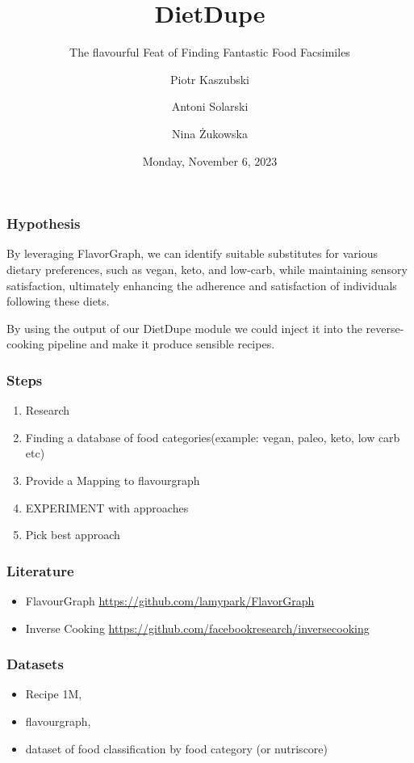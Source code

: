 \documentclass{beamer}
\title{DietDupe}
\subtitle{The flavourful Feat of Finding Fantastic Food Facsimiles}
\author{Piotr Kaszubski \and Antoni Solarski \and Nina Żukowska}
\institute{Poznań University of Technology}
\date{Monday, November  6, 2023}
\begin{document}
\maketitle
\begin{frame}
	\frametitle{Hypothesis}
	By leveraging FlavorGraph, we can identify suitable
	substitutes for various dietary preferences, such as vegan,
	keto, and low-carb, while maintaining sensory satisfaction,
	ultimately enhancing the adherence and satisfaction of
	individuals following these diets.

	\vspace{1cm}
	\noindent
	By using the output of our DietDupe module we could inject it
	into the reverse-cooking pipeline and make it produce
	sensible recipes.
\end{frame}

\begin{frame}
	\frametitle{Steps}
	\begin{enumerate}
		\item Research
		\item Finding a database of food categories(example: vegan, paleo, keto, low carb etc) 
		\item Provide a Mapping to flavourgraph 
		\item EXPERIMENT with approaches 
		\item Pick best approach
	\end{enumerate}
\end{frame}

\begin{frame}
	\frametitle{Literature}
	\begin{itemize}
		\item 
			FlavourGraph \url{https://github.com/lamypark/FlavorGraph}
		\item 
			Inverse Cooking \url{https://github.com/facebookresearch/inversecooking}
	\end{itemize}

\end{frame}
\begin{frame}
	\frametitle{Datasets}
	\begin{itemize}
		\item Recipe 1M, 
		\item flavourgraph, 
		\item dataset of food classification by food category (or nutriscore)
	\end{itemize}
\end{frame}
\end{document}
